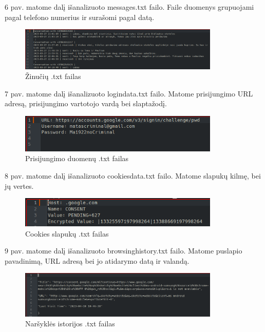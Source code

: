 \documentclass[a4paper,12pt,fleqn]{article}
\begin{document}
6 pav. matome dalį išanalizuoto messages.txt failo. Faile duomenys grupuojami pagal telefono numerius ir surašomi pagal datą.
\begin{figure} [h]
    \centering
    \includegraphics[width=0.85\textwidth]{pav_sms.png}
    \caption{Žinučių .txt failas}
    \label{fig:messages}
\end{figure}


7 pav. matome dalį išanalizuoto login\textunderscore data.txt failo. Matome prisijungimo URL adresą, prisijungimo vartotojo vardą bei slaptažodį.

\begin{figure} [h]
    \centering
    \includegraphics[width=0.85\textwidth]{login-example.png}
    \caption{Prisijungimo duomenų .txt failas}
    \label{fig:login}
\end{figure}
8 pav. matome dalį išanalizuoto cookies\textunderscore data.txt failo. Matome slapukų kilmę, bei jų vertes.

\begin{figure} [h]
    \centering
    \includegraphics[width=0.85\textwidth]{cookies-example.png}
    \caption{Cookies slapukų .txt failas}
    \label{fig:cookies}
\end{figure}
9 pav. matome dalį išanalizuoto browsing\textunderscore history.txt failo. Matome puslapio pavadinimą, URL adresą bei jo atidarymo datą ir valandą.

\begin{figure} [H]
    \centering
    \includegraphics[width=0.85\textwidth]{browsing_history.png}
    \caption{Naršyklės istorijos .txt failas}
    \label{fig:history}
\end{figure}
\end{document}
